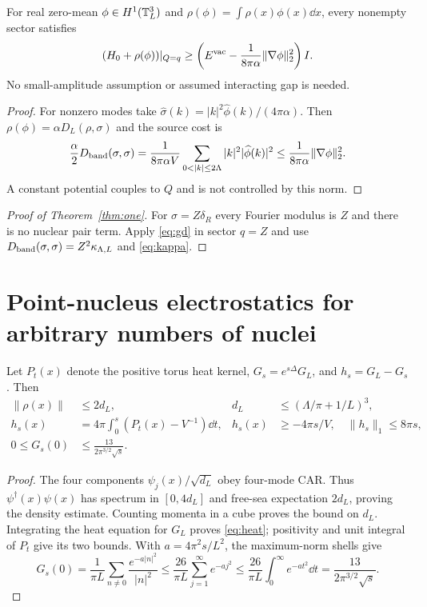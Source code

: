 \begin{corollary}\label{cor:dielectric}
For real zero-mean $\phi\in H^1(\mathbb T_L^3)$ and
$\rho(\phi)=\int\rho(x)\phi(x)\dd x$, every nonempty sector satisfies
\begin{equation}
(H_0+\rho(\phi))|_{Q=q}
\ge\left(E^{\mathrm{vac}}-\frac1{8\pi\alpha}\|\nabla\phi\|_2^2\right)I.
\label{eq:interacting-dielectric}
\end{equation}
No small-amplitude assumption or assumed interacting gap is needed.
\end{corollary}
\begin{proof}
For nonzero modes take
$\widehat\sigma(k)=|k|^2\widehat\phi(k)/(4\pi\alpha)$.
Then $\rho(\phi)=\alpha D_L(\rho,\sigma)$ and the source cost is
\[
\frac\alpha2D_{\rm band}(\sigma,\sigma)
=\frac1{8\pi\alpha V}\sum_{0<|k|\le2\Lambda}
|k|^2|\widehat\phi(k)|^2
\le\frac1{8\pi\alpha}\|\nabla\phi\|_2^2.
\]
A constant potential couples to $Q$ and is not controlled by this norm.
\end{proof}

\begin{proof}[Proof of Theorem~\ref{thm:one}]
For $\sigma=Z\delta_R$ every Fourier modulus is $Z$ and there is no
nuclear pair term. Apply \eqref{eq:gd} in sector $q=Z$ and use
$D_{\rm band}(\sigma,\sigma)=Z^2\kappa_{\Lambda,L}$
and \eqref{eq:kappa}.
\end{proof}

\section{Point-nucleus electrostatics for arbitrary numbers of nuclei}
\begin{lemma}\label{lem:heat}
Let $P_t(x)$ denote the positive torus heat kernel,
$G_s=e^{s\Delta}G_L$, and $h_s=G_L-G_s$. Then
\begin{align}
\|\rho(x)\|&\le2d_L,&d_L&\le(\Lambda/\pi+1/L)^3,\label{eq:density}\\
h_s(x)&=4\pi\int_0^s(P_t(x)-V^{-1})\dd t,&
h_s(x)&\ge-4\pi s/V,\quad\|h_s\|_1\le8\pi s,\label{eq:heat}\\
0\le G_s(0)&\le\frac{13}{2\pi^{3/2}\sqrt{s}}.
\label{eq:heat-self}
\end{align}
\end{lemma}
\begin{proof}
The four components $\psi_j(x)/\sqrt{d_L}$ obey four-mode CAR.
Thus $\psi^\dagger(x)\psi(x)$ has spectrum in $[0,4d_L]$ and
free-sea expectation $2d_L$, proving the density estimate.
Counting momenta in a cube proves the bound on $d_L$.
Integrating the heat equation for $G_L$ proves \eqref{eq:heat};
positivity and unit integral of $P_t$ give its two bounds.
With $a=4\pi^2s/L^2$, the maximum-norm shells give
\[
G_s(0)=\frac1{\pi L}\sum_{n\ne0}\frac{e^{-a|n|^2}}{|n|^2}
\le\frac{26}{\pi L}\sum_{j=1}^\infty e^{-aj^2}
\le\frac{26}{\pi L}\int_0^\infty e^{-at^2}\dd t
=\frac{13}{2\pi^{3/2}\sqrt{s}}.
\]
\end{proof}

